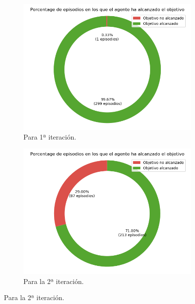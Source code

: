 \begin{figure}
    \centering
    \begin{subfigure}{.5\textwidth}
        \centering
        \includegraphics[scale=0.3]{cap5_experimentacion/images/CHANGE_ORIGIN-20_09-00_50-0, 2, 1_it1_porcentajeResuelto.png}
        \caption{Para 1ª iteración.}
        \label{fig:CHANGE_ORIGIN-20_09-00_50-0, 2, 1_it1_porcentajeResuelto}
    \end{subfigure}%
    \begin{subfigure}{.5\textwidth}
        \centering
        \includegraphics[scale=0.3]{cap5_experimentacion/images/CHANGE_ORIGIN-20_09-00_50-0, 2, 1_it2_porcentajeResuelto.png}
        \caption{Para la 2ª iteración.}
        \label{fig:CHANGE_ORIGIN-20_09-00_50-0, 2, 1_it2_porcentajeResuelto}

\end{subfigure}
\end{figure}
